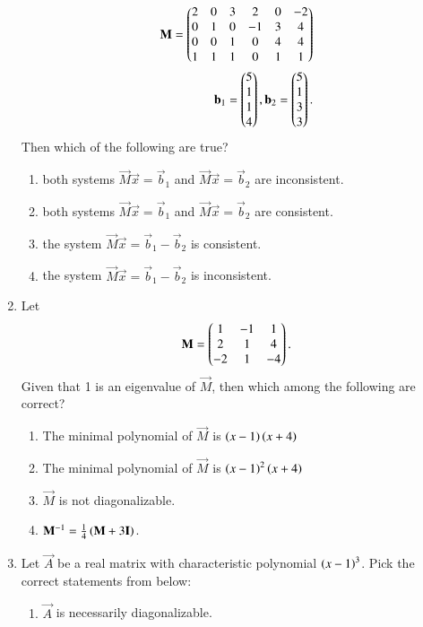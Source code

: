 \begin{enumerate}[label=\thesection.\arabic*.,ref=\thesection.\theenumi]
\begin{align}
\mathbf{M} = 
\begin{pmatrix}
2 & 0 & 3 & 2 & 0 & -2
\\
0 & 1 & 0 & -1 & 3 & 4
\\
0 & 0 & 1 & 0 & 4 & 4
\\
1 & 1 & 1 & 0 & 1 & 1
\end{pmatrix}
\\
\mathbf{b}_1 = \begin{pmatrix}5 \\ 1 \\ 1 \\ 4\end{pmatrix},
\mathbf{b}_2 = \begin{pmatrix}5 \\ 1 \\ 3 \\ 3\end{pmatrix}.
\end{align}  
Then which of the following are true?
\begin{enumerate}
\item both systems $\vec{M}\vec{x} = \vec{b}_1$ and $\vec{M}\vec{x} = \vec{b}_2$ are inconsistent.
\item both systems $\vec{M}\vec{x} = \vec{b}_1$ and $\vec{M}\vec{x} = \vec{b}_2$ are consistent. 
\item the system $\vec{M}\vec{x} = \vec{b}_1-\vec{b}_2$ is consistent. 
\item the system $\vec{M}\vec{x} = \vec{b}_1-\vec{b}_2$ is inconsistent. 
\end{enumerate}
%
%
\solution

\item Let 
\begin{align}
\mathbf{M} = \begin{pmatrix}
1 & -1 & 1 \\
2 & 1 & 4 \\
-2 & 1 & -4 
\end{pmatrix}.
\end{align}
Given that 1 is an eigenvalue of $\vec{M}$, then which among the following
are correct?
\begin{enumerate}
\item The minimal polynomial of  $\vec{M}$ is $\left(x-1\right)\left(x+4\right)$ 
\item The minimal polynomial of  $\vec{M}$ is $\left(x-1\right)^2\left(x+4\right)$ 
\item   $\vec{M}$ is not diagonalizable.
\item $\mathbf{M}^{-1} = \frac{1}{4}\left(\mathbf{M}+3\mathbf{I}\right)$. 
\end{enumerate}
%
\solution

\item Let $\vec{A}$ be a real matrix with characteristic polynomial $\left(x-1\right)^3$.  Pick the correct statements from below:
\begin{enumerate}
\item $\vec{A}$ is necessarily diagonalizable.

\end{enumerate}
\end{enumerate}
